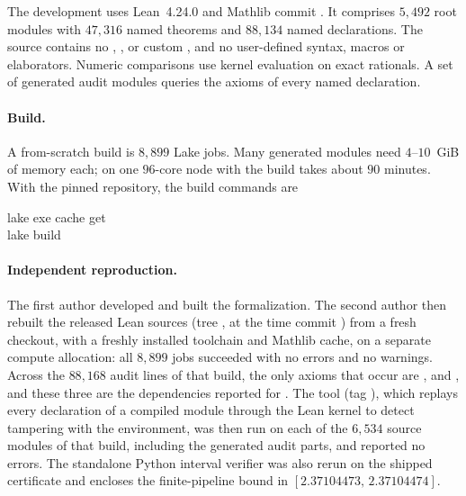 \documentclass[11pt,a4paper]{article}
\begin{document}
The development uses Lean~4.24.0 and Mathlib commit  \citep{lean4,mathlib2020}. It comprises $5{,}492$ root modules with $47{,}316$ named theorems and $88{,}134$ named declarations. The source contains no , ,  or custom , and no user-defined syntax, macros or elaborators. Numeric comparisons use kernel evaluation on exact rationals. A set of generated audit modules queries the axioms of every named declaration.

\paragraph{Build.} A from-scratch build is $8{,}899$ Lake jobs. Many generated modules need $4$--$10$~GiB of memory each; on one $96$-core node with  the build takes about $90$ minutes. With the pinned repository, the build commands are
\begin{algorithmnote}
\small\ttfamily
\noindent lake exe cache get\\
lake build
\end{algorithmnote}

\paragraph{Independent reproduction.} The first author developed and built the formalization. The second author then rebuilt the released Lean sources (tree , at the time commit ) from a fresh checkout, with a freshly installed toolchain and Mathlib cache, on a separate compute allocation: all $8{,}899$ jobs succeeded with no errors and no  warnings. Across the $88{,}168$ audit lines of that build, the only axioms that occur are ,  and , and these three are the dependencies reported for . The  tool (tag ), which replays every declaration of a compiled module through the Lean kernel to detect tampering with the environment, was then run on each of the $6{,}534$ source modules of that build, including the generated audit parts, and reported no errors. The standalone Python interval verifier was also rerun on the shipped certificate and encloses the finite-pipeline bound in $[2.37104473,\,2.37104474]$.
\end{document}
